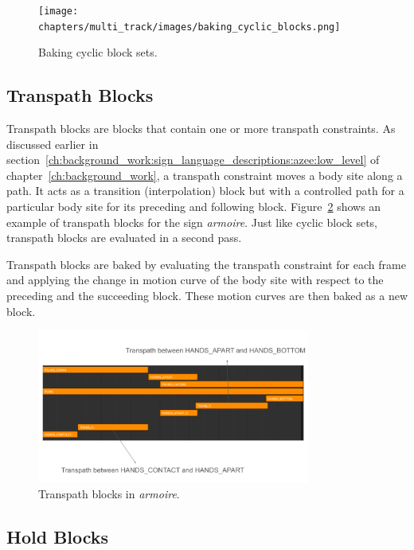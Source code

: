 \documentclass[../../main.tex]{subfiles}
\begin{document}
\begin{figure}
    \centering
    \texttt{[image: chapters/multi\_track/images/baking\_cyclic\_blocks.png]}
    \caption{Baking cyclic block sets.}
    \label{fig:baking_cyclic_blocks}
\end{figure}

\subsection{Transpath Blocks}
\label{ch:multi_track:second_pass:transpath_blocks}

Transpath blocks are blocks that contain one or more transpath constraints. As discussed earlier in section~\ref{ch:background_work:sign_language_descriptions:azee:low_level} of chapter~\ref{ch:background_work}, a transpath constraint moves a body site along a path. It acts as a transition (interpolation) block but with a controlled path for a particular body site for its preceding and following block. Figure~\ref{fig:transpath_blocks} shows an example of transpath blocks for the sign \emph{armoire}. Just like cyclic block sets, transpath blocks are evaluated in a second pass.

Transpath blocks are baked by evaluating the transpath constraint for each frame and applying the change in motion curve of the body site with respect to the preceding and the succeeding block. These motion curves are then baked as a new block.

\begin{figure}[h]
    \centering
    \includegraphics[width=0.8\textwidth]{chapters/multi_track/images/transpath_blocks.png}
    \caption{Transpath blocks in \emph{armoire}.}
    \label{fig:transpath_blocks}
\end{figure}

\subsection{Hold Blocks}
\label{ch:multi_track:second_pass:hold_blocks}
\end{document}
